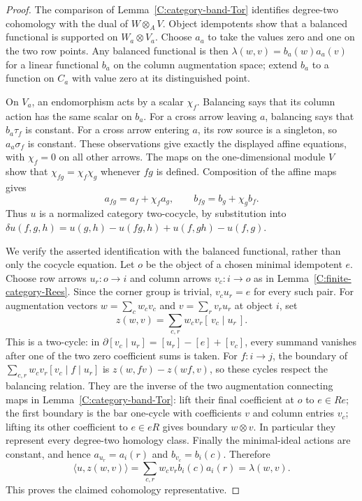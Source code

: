 \begin{proof}
The comparison of Lemma~\ref{C:category-band-Tor} identifies
degree-two cohomology with the dual of $W\otimes_A V$.
Object idempotents show that a balanced functional is supported on
$W_a\otimes V_a$.  Choose $a_a$ to take the values zero and one
on the two row points.  Any balanced functional is then
$\lambda(w,v)=b_a(w)a_a(v)$ for a linear functional $b_a$ on
the column augmentation space; extend $b_a$ to a function on
$C_a$ with value zero at its distinguished point.

On $V_a$, an endomorphism acts by a scalar $\chi_f$.
Balancing says that its column action has the same scalar on
$b_a$.  For a cross arrow leaving $a$, balancing says that
$b_a\tau_f$ is constant.  For a cross arrow entering $a$, its
row source is a singleton, so $a_a\sigma_f$ is constant.
These observations give exactly the displayed affine equations,
with $\chi_f=0$ on all other arrows.  The maps on the one-dimensional
module $V$ show that $\chi_{fg}=\chi_f\chi_g$ whenever $fg$ is
defined.  Composition of the affine maps gives
\begin{equation}\label{C:category-affine-composition}
 a_{fg}=a_f+\chi_f a_g,\qquad
 b_{fg}=b_g+\chi_g b_f.
\end{equation}
Thus $u$ is a normalized category two-cocycle, by substitution into
$\delta u(f,g,h)=u(g,h)-u(fg,h)+u(f,gh)-u(f,g)$.

We verify the asserted identification with the balanced functional,
rather than only the cocycle equation.  Let $o$ be the object of a
chosen minimal idempotent $e$.  Choose row arrows
$u_r:o\to i$ and column arrows $v_c:i\to o$ as in
Lemma~\ref{C:finite-category-Rees}.  Since the corner group is
trivial, $v_cu_r=e$ for every such pair.  For augmentation vectors
$w=\sum_c w_cv_c$ and $v=\sum_r v_ru_r$ at object $i$, set
\[
 z(w,v)=\sum_{c,r}w_cv_r[\,v_c\mid u_r\,].
\]
This is a two-cycle: in
$\partial[v_c\mid u_r]=[u_r]-[e]+[v_c]$, every summand vanishes
after one of the two zero coefficient sums is taken.  For
$f:i\to j$, the boundary of
$\sum_{c,r}w_cv_r[v_c\mid f\mid u_r]$ is
$z(w,fv)-z(wf,v)$, so these cycles respect the balancing relation.
They are the inverse of the two augmentation connecting maps in
Lemma~\ref{C:category-band-Tor}: lift their final coefficient at
$o$ to $e\in Re$; the first boundary is the bar one-cycle with
coefficients $v$ and column entries $v_c$; lifting its other
coefficient to $e\in eR$ gives boundary $w\otimes v$.
In particular they represent every degree-two homology class.
Finally the minimal-ideal actions are constant, and hence
$a_{u_r}=a_i(r)$ and $b_{v_c}=b_i(c)$.  Therefore
\[
 \langle u,z(w,v)\rangle
 =\sum_{c,r}w_cv_r b_i(c)a_i(r)=\lambda(w,v).
\]
This proves the claimed cohomology representative.
\end{proof}

